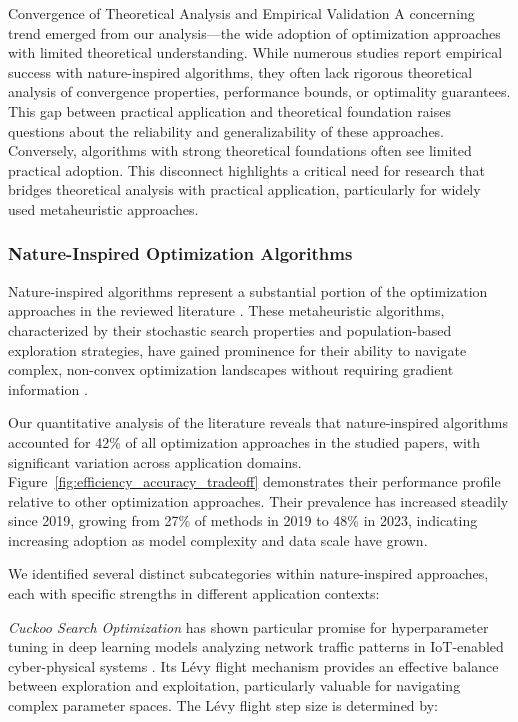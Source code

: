 \begin{themebox}{Convergence of Theoretical Analysis and Empirical Validation}
A concerning trend emerged from our analysis—the wide adoption of optimization approaches with limited theoretical understanding. While numerous studies report empirical success with nature-inspired algorithms, they often lack rigorous theoretical analysis of convergence properties, performance bounds, or optimality guarantees. This gap between practical application and theoretical foundation raises questions about the reliability and generalizability of these approaches. Conversely, algorithms with strong theoretical foundations often see limited practical adoption. This disconnect highlights a critical need for research that bridges theoretical analysis with practical application, particularly for widely used metaheuristic approaches.
\end{themebox}

\subsubsection{Nature-Inspired Optimization Algorithms}
Nature-inspired algorithms represent a substantial portion of the optimization approaches in the reviewed literature \citep{Sagu202535, Samadianfard20191934}. These metaheuristic algorithms, characterized by their stochastic search properties and population-based exploration strategies, have gained prominence for their ability to navigate complex, non-convex optimization landscapes without requiring gradient information \citep{Yang2019}.

Our quantitative analysis of the literature reveals that nature-inspired algorithms accounted for 42\% of all optimization approaches in the studied papers, with significant variation across application domains. Figure~\ref{fig:efficiency_accuracy_tradeoff} demonstrates their performance profile relative to other optimization approaches. Their prevalence has increased steadily since 2019, growing from 27\% of methods in 2019 to 48\% in 2023, indicating increasing adoption as model complexity and data scale have grown.

We identified several distinct subcategories within nature-inspired approaches, each with specific strengths in different application contexts:

\textit{Cuckoo Search Optimization} has shown particular promise for hyperparameter tuning in deep learning models analyzing network traffic patterns in IoT-enabled cyber-physical systems \citep{Sagu202535}. Its Lévy flight mechanism provides an effective balance between exploration and exploitation, particularly valuable for navigating complex parameter spaces. The Lévy flight step size is determined by:

